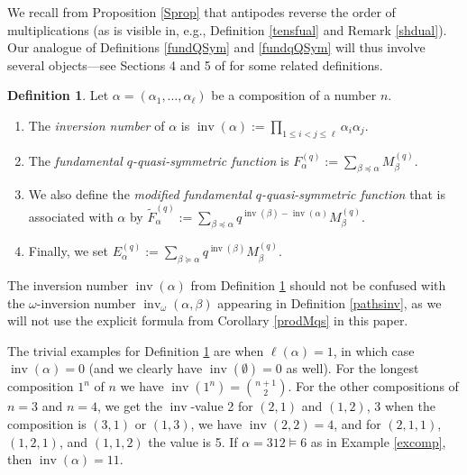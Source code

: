 \documentclass{article}
\theoremstyle{definition}
\newtheorem{defn}[thm]{Definition}
\begin{document}
\medskip

We recall from Proposition \ref{Sprop} that antipodes reverse the order of multiplications (as is visible in, e.g., Definition \ref{tensfual} and Remark \ref{shdual}). Our analogue of Definitions \ref{fundQSym} and \ref{fundqQSym} will thus involve several objects---see Sections 4 and 5 of \cite{[TU]} for some related definitions.
\begin{defn}
Let $\alpha=(\alpha_{1},\ldots,\alpha_{\ell})$ be a composition of a number $n$.
\begin{enumerate}[$(i)$]
\item The \emph{inversion number} of $\alpha$ is $\operatorname{inv}(\alpha):=\prod_{1 \leq i<j\leq\ell}\alpha_{i}\alpha_{j}$.
\item The \emph{fundamental $q$-quasi-symmetric function} is $F_{\alpha}^{(q)}:=\sum_{\beta\preceq\alpha}M_{\beta}^{(q)}$.
\item We also define the \emph{modified fundamental $q$-quasi-symmetric function} that is associated with $\alpha$ by $\widetilde{F}_{\alpha}^{(q)}:=\sum_{\beta\preceq\alpha}q^{\operatorname{inv}(\beta)-\operatorname{inv}(\alpha)}M_{\beta}^{(q)}$.
\item Finally, we set $E_{\alpha}^{(q)}:=\sum_{\beta\succeq\alpha}q^{\operatorname{inv}(\beta)}M_{\beta}^{(q)}$.
\end{enumerate} \label{fundQSymq}
\end{defn}
The inversion number $\operatorname{inv}(\alpha)$ from Definition \ref{fundQSymq} should not be confused with the $\omega$-inversion number $\operatorname{inv}_{\omega}(\alpha,\beta)$ appearing in Definition \ref{pathsinv}, as we will not use the explicit formula from Corollary \ref{prodMqs} in this paper.

The trivial examples for Definition \ref{fundQSymq} are when $\ell(\alpha)=1$, in which case $\operatorname{inv}(\alpha)=0$ (and we clearly have $\operatorname{inv}(\emptyset)=0$ as well). For the longest composition $1^{n}$ of $n$ we have $\operatorname{inv}(1^{n})=\binom{n+1}{2}$. For the other compositions of $n=3$ and $n=4$, we get the $\operatorname{inv}$-value 2 for $(2,1)$ and $(1,2)$, 3 when the composition is $(3,1)$ or $(1,3)$, we have $\operatorname{inv}(2,2)=4$, and for $(2,1,1)$, $(1,2,1)$, and $(1,1,2)$ the value is 5. If $\alpha=312\vDash6$ as in Example \ref{excomp}, then $\operatorname{inv}(\alpha)=11$.
\end{document}
